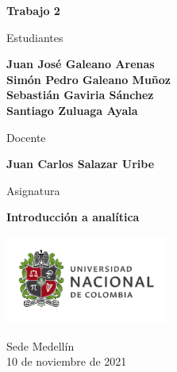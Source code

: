 \begin{titlepage}
   \Large{
   \begin{center}
       \vspace*{1cm}

       \textbf{Trabajo 2}

            
       \vspace{1cm}
       
       Estudiantes
       
       \vspace{0.5cm}
        
        
       \textbf{Juan José Galeano Arenas} \\
       \textbf{Simón Pedro Galeano Muñoz} \\
       \textbf{Sebastián Gaviria Sánchez} \\
       \textbf{Santiago Zuluaga Ayala} \\
       
              \vspace{1cm}
       
       Docente
       
       \vspace{0.5cm}

       \textbf{Juan Carlos Salazar Uribe}
       
       \vspace{0.4cm}

       \vspace{1.5cm}
       
       Asignatura
       
       \vspace{0.5cm}

       \textbf{Introducción a analítica}

       \vfill

            
       \vspace{0.1cm}
     
       \includegraphics[width=0.4\textwidth]{logounal.png}
            
       Sede Medellín\\
       10 de noviembre de 2021
       
   \end{center}
   }
\end{titlepage}